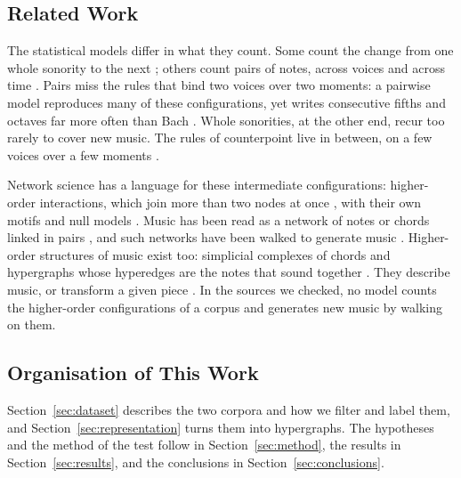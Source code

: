 \subsection{Related Work}

The statistical models differ in what they count. Some count the change from one whole sonority to the next \cite{allan2004, whorley2013}; others count pairs of notes, across voices and across time \cite{hadjeres2016}. Pairs miss the rules that bind two voices over two moments: a pairwise model reproduces many of these configurations, yet writes consecutive fifths and octaves far more often than Bach \cite{hadjeres2016}. Whole sonorities, at the other end, recur too rarely to cover new music. The rules of counterpoint live in between, on a few voices over a few moments \cite{fux1725}.

Network science has a language for these intermediate configurations: higher-order interactions, which join more than two nodes at once \cite{battiston2020}, with their own motifs and null models \cite{lotito2022}. Music has been read as a network of notes or chords linked in pairs \cite{kulkarni2024, dimarco2026}, and such networks have been walked to generate music \cite{liu2009}. Higher-order structures of music exist too: simplicial complexes of chords \cite{bigo2015, mrad2026} and hypergraphs whose hyperedges are the notes that sound together \cite{coupette2023}. They describe music, or transform a given piece \cite{bigo2015}. In the sources we checked, no model counts the higher-order configurations of a corpus and generates new music by walking on them.

\subsection{Organisation of This Work}

Section~\ref{sec:dataset} describes the two corpora and how we filter and label them, and Section~\ref{sec:representation} turns them into hypergraphs. The hypotheses and the method of the test follow in Section~\ref{sec:method}, the results in Section~\ref{sec:results}, and the conclusions in Section~\ref{sec:conclusions}.
